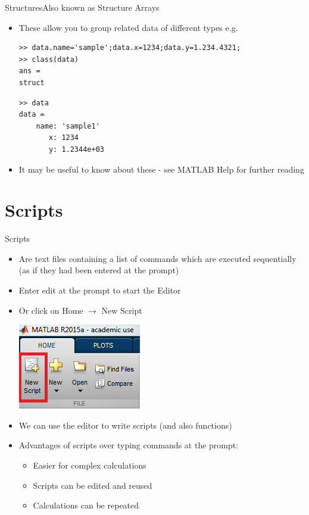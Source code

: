 \documentclass{beamer}
\begin{document}
\begin{frame}[fragile]{Structures}{Also known as Structure Arrays}
	\begin{itemize}
		\item These allow you to group related data of different types e.g.
		
		\begin{lstlisting}[style=Matlab-editor]
>> data.name='sample';data.x=1234;data.y=1.234.4321;
>> class(data)
ans = 
struct
		\end{lstlisting}
		\begin{lstlisting}[style=Matlab-bw]
>> data
data = 
    name: 'sample1'
       x: 1234
       y: 1.2344e+03 
		\end{lstlisting}	
		\item It may be useful to know about these - see MATLAB Help for further reading
	\end{itemize}
\end{frame}

\section{Scripts}
\begin{frame}{Scripts}
	\begin{itemize}
		\item Are text files containing a list of commands which are executed sequentially (as if they had been entered at the prompt)
		\item Enter edit at the prompt to start the Editor
		\item Or click on Home $\rightarrow$ New Script
		
		\includegraphics[scale=0.7]{new_script}	
		
		\item We can use the editor to write scripts (and also functions)
		\item Advantages of scripts over typing commands at the prompt:
			\begin{itemize}
				\item Easier for complex calculations
				\item Scripts can be edited and reused
				\item Calculations can be repeated
			\end{itemize}
	\end{itemize}
\end{frame}
\end{document}
